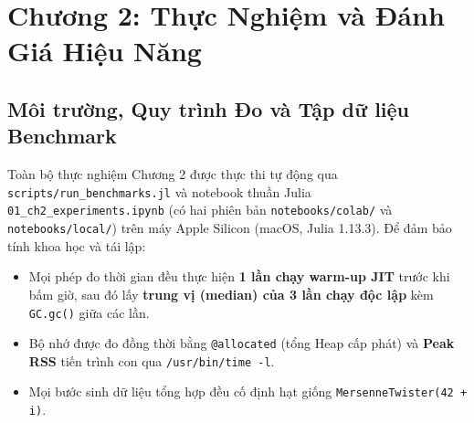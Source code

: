 \documentclass[conference]{IEEEtran}
\begin{document}
\begin{table}[htbp]
\caption{Đối chứng tốc độ và bộ nhớ cấp phát giữa Baseline và Optimized (Unit Benchmark sau warm-up JIT)}
\label{tab:ch1_bench}
\centering
{}
\end{table}

\section{Chương 2: Thực Nghiệm và Đánh Giá Hiệu Năng}

\subsection{Môi trường, Quy trình Đo và Tập dữ liệu Benchmark}
Toàn bộ thực nghiệm Chương 2 được thực thi tự động qua \texttt{scripts/run\_benchmarks.jl} và notebook thuần Julia \texttt{01\_ch2\_experiments.ipynb} (có hai phiên bản \texttt{notebooks/colab/} và \texttt{notebooks/local/}) trên máy Apple Silicon (macOS, Julia 1.13.3). Để đảm bảo tính khoa học và tái lập:
\begin{itemize}
    \item Mọi phép đo thời gian đều thực hiện \textbf{1 lần chạy warm-up JIT} trước khi bấm giờ, sau đó lấy \textbf{trung vị (median) của 3 lần chạy độc lập} kèm \texttt{GC.gc()} giữa các lần.
    \item Bộ nhớ được đo đồng thời bằng \texttt{@allocated} (tổng Heap cấp phát) và \textbf{Peak RSS} tiến trình con qua \texttt{/usr/bin/time -l}.
    \item Mọi bước sinh dữ liệu tổng hợp đều cố định hạt giống \texttt{MersenneTwister(42 + i)}.
\end{itemize}
\end{document}
